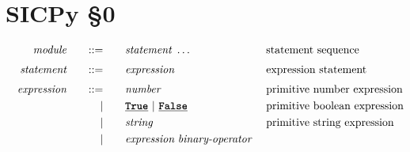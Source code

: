 \section*{SICPy \S0}
\begin{alignat*}{9}
&& \textit{module}       &&\quad ::= &\quad && \textit{statement} \ \ldots 
                                                            && \textrm{statement sequence} \\[1mm]
&& \textit{statement}    &&\quad ::= &\quad &&  \textit{expression} \ %
                                                           && \textrm{expression statement} \\[1mm]
&& \textit{expression}   && ::= &\quad &&  \textit{number}   && \textrm{primitive number expression}\\
&&                       && |   &\quad && \textbf{\texttt{\underline{True}}}\ |\ \textbf{\texttt{\underline{False}}}
                                                           && \textrm{primitive boolean expression}\\
&&                       && |   &\quad &&  \textit{string}   && \textrm{primitive string expression}\\
&&                       && |   &\quad &&  \textit{expression} \  \textit{binary-operator} \ 

\end{alignat*}
